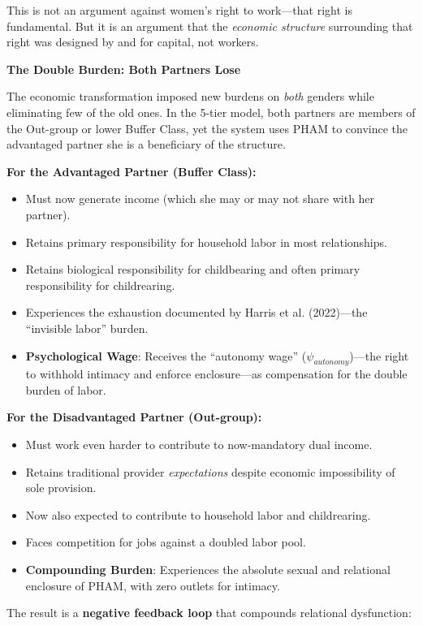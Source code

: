 \documentclass[12pt,openany]{book}
\numberwithin{equation}{chapter}
\begin{document}
This is not an argument against women's right to work---that right is fundamental. But it is an argument that the \textit{economic structure} surrounding that right was designed by and for capital, not workers.

\textbf{The Double Burden: Both Partners Lose}

The economic transformation imposed new burdens on \textit{both} genders while eliminating few of the old ones. In the 5-tier model, both partners are members of the Out-group or lower Buffer Class, yet the system uses PHAM to convince the advantaged partner she is a beneficiary of the structure.

\textbf{For the Advantaged Partner (Buffer Class):}
\begin{itemize}
    \item Must now generate income (which she may or may not share with her partner).
    \item Retains primary responsibility for household labor in most relationships.
    \item Retains biological responsibility for childbearing and often primary responsibility for childrearing.
    \item Experiences the exhaustion documented by Harris et al. (2022)---the ``invisible labor'' burden.
    \item \textbf{Psychological Wage}: Receives the ``autonomy wage'' ($\psi_{autonomy}$)---the right to withhold intimacy and enforce enclosure---as compensation for the double burden of labor.
\end{itemize}

\textbf{For the Disadvantaged Partner (Out-group):}
\begin{itemize}
    \item Must work even harder to contribute to now-mandatory dual income.
    \item Retains traditional provider \textit{expectations} despite economic impossibility of sole provision.
    \item Now also expected to contribute to household labor and childrearing.
    \item Faces competition for jobs against a doubled labor pool.
    \item \textbf{Compounding Burden}: Experiences the absolute sexual and relational enclosure of PHAM, with zero outlets for intimacy.
\end{itemize}

The result is a \textbf{negative feedback loop} that compounds relational dysfunction:
\end{document}
